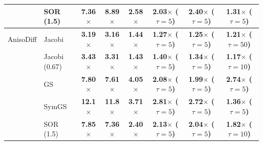 {\begin{tabular}{llcccccc}
 & SOR (1.5) & \textbf{7.36$\times$} & \textbf{8.89$\times$} & \textbf{2.58$\times$} & \textbf{2.03$\times$ ($\tau{=}5$)} & \textbf{2.40$\times$ ($\tau{=}5$)} & \textbf{1.31$\times$ ($\tau{=}5$)} \\
\midrule
AnisoDiff & Jacobi & \textbf{3.19$\times$} & \textbf{3.16$\times$} & \textbf{1.44$\times$} & \textbf{1.27$\times$ ($\tau{=}5$)} & \textbf{1.25$\times$ ($\tau{=}5$)} & \textbf{1.21$\times$ ($\tau{=}50$)} \\
 & Jacobi (0.67) & \textbf{3.43$\times$} & \textbf{3.31$\times$} & \textbf{1.43$\times$} & \textbf{1.40$\times$ ($\tau{=}5$)} & \textbf{1.34$\times$ ($\tau{=}5$)} & \textbf{1.17$\times$ ($\tau{=}10$)} \\
 & GS & \textbf{7.80$\times$} & \textbf{7.61$\times$} & \textbf{4.05$\times$} & \textbf{2.08$\times$ ($\tau{=}5$)} & \textbf{1.99$\times$ ($\tau{=}5$)} & \textbf{2.74$\times$ ($\tau{=}5$)} \\
 & SymGS & \textbf{12.1$\times$} & \textbf{11.8$\times$} & \textbf{3.71$\times$} & \textbf{2.81$\times$ ($\tau{=}5$)} & \textbf{2.72$\times$ ($\tau{=}5$)} & \textbf{1.36$\times$ ($\tau{=}5$)} \\
 & SOR (1.5) & \textbf{7.85$\times$} & \textbf{7.36$\times$} & \textbf{2.40$\times$} & \textbf{2.13$\times$ ($\tau{=}5$)} & \textbf{2.04$\times$ ($\tau{=}5$)} & \textbf{1.82$\times$ ($\tau{=}10$)} \\
\bottomrule
\end{tabular}}
